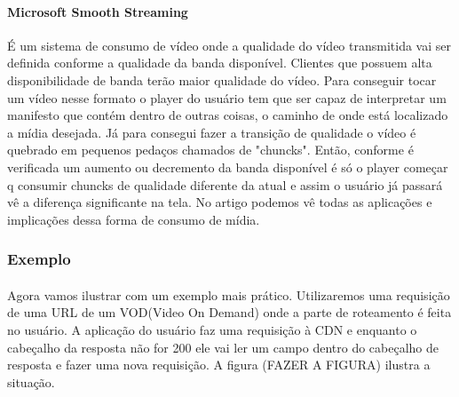 \paragraph{Microsoft Smooth Streaming} \'E um sistema de consumo de v\'ideo onde a qualidade do v\'ideo transmitida vai ser definida conforme a qualidade da banda dispon\'ivel. Clientes que possuem alta disponibilidade de banda ter\~ao maior qualidade do v\'ideo. 
\newline Para conseguir tocar um v\'ideo nesse formato o player do usu\'ario tem que ser capaz de interpretar um manifesto que cont\'em dentro de outras coisas, o caminho de onde est\'a localizado a m\'idia desejada. 
\newline J\'a para consegui fazer a transi\c{c}\~ao de qualidade o v\'ideo \'e quebrado em pequenos peda\c{c}os chamados de "chuncks". Ent\~ao, conforme \'e verificada um aumento ou decremento da banda dispon\'ivel \'e s\'o o player come\c{c}ar q consumir chuncks de qualidade diferente da atual e assim o usu\'ario j\'a passar\'a v\^e a diferen\c{c}a significante na tela. 
\newline No artigo \cite{zambelli2009iis} podemos v\^e todas as aplica\c{c}\~oes e implica\c{c}\~oes dessa forma de consumo de m\'idia.
\subsubsection{Exemplo}
\label{subsubsection:vod_exemplo}
\paragraph{} Agora vamos ilustrar com um exemplo mais pr\'atico. Utilizaremos uma requisi\c{c}\~ao de uma URL de um VOD(Video On Demand) onde a parte de roteamento \'e feita no usu\'ario. A aplica\c{c}\~ao do usu\'ario faz uma requisi\c{c}\~ao \`a CDN e enquanto o cabe\c{c}alho da resposta n\~ao for 200 ele vai ler um campo dentro do cabe\c{c}alho de resposta e fazer uma nova requisi\c{c}\~ao. A figura (FAZER A FIGURA) ilustra a situa\c{c}\~ao.

